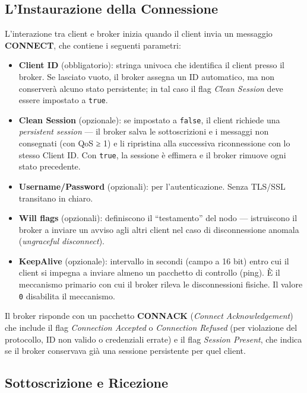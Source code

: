 \documentclass[
  italian,
  openany]{book}
\providecommand{\tightlist}{%
  \setlength{\itemsep}{0pt}\setlength{\parskip}{0pt}}
\begin{document}
\subsection{L'Instaurazione della
Connessione}\label{linstaurazione-della-connessione}

L'interazione tra client e broker inizia quando il client invia un
messaggio \textbf{CONNECT}, che contiene i seguenti parametri:

\begin{itemize}
\tightlist
\item
  \textbf{Client ID} (obbligatorio): stringa univoca che identifica il
  client presso il broker. Se lasciato vuoto, il broker assegna un ID
  automatico, ma non conserverà alcuno stato persistente; in tal caso il
  flag \emph{Clean Session} deve essere impostato a \texttt{true}.
\item
  \textbf{Clean Session} (opzionale): se impostato a \texttt{false}, il
  client richiede una \emph{persistent session} --- il broker salva le
  sottoscrizioni e i messaggi non consegnati (con QoS ≥ 1) e li
  ripristina alla successiva riconnessione con lo stesso Client ID. Con
  \texttt{true}, la sessione è effimera e il broker rimuove ogni stato
  precedente.
\item
  \textbf{Username/Password} (opzionali): per l'autenticazione. Senza
  TLS/SSL transitano in chiaro.
\item
  \textbf{Will flags} (opzionali): definiscono il ``testamento'' del
  nodo --- istruiscono il broker a inviare un avviso agli altri client
  nel caso di disconnessione anomala (\emph{ungraceful disconnect}).
\item
  \textbf{KeepAlive} (opzionale): intervallo in secondi (campo a 16 bit)
  entro cui il client si impegna a inviare almeno un pacchetto di
  controllo (ping). È il meccanismo primario con cui il broker rileva le
  disconnessioni fisiche. Il valore \texttt{0} disabilita il meccanismo.
\end{itemize}

Il broker risponde con un pacchetto \textbf{CONNACK} (\emph{Connect
Acknowledgement}) che include il flag \emph{Connection Accepted} o
\emph{Connection Refused} (per violazione del protocollo, ID non valido
o credenziali errate) e il flag \emph{Session Present}, che indica se il
broker conservava già una sessione persistente per quel client.

\subsection{Sottoscrizione e
Ricezione}\label{sottoscrizione-e-ricezione}
\end{document}
